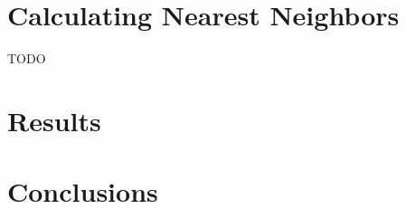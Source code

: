 \documentclass[cameraready]{acmsiggraph-awb}
\begin{document}
\section{Calculating Nearest Neighbors}
TODO

\section{Results}


\section{Conclusions}


%
%
%
%












\end{document}
